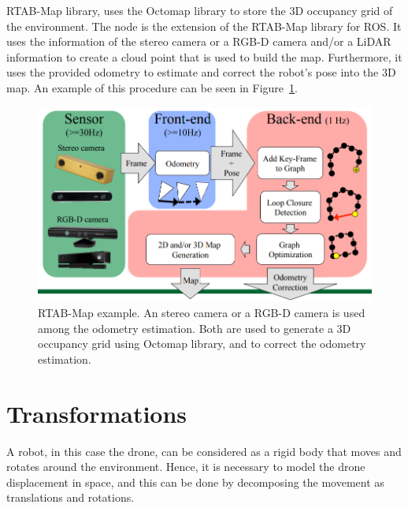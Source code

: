 \ac{RTAB-Map} library, uses the Octomap library to store the 3D occupancy grid of the environment. The  node is the extension of the \ac{RTAB-Map} library for \ac{ROS}. It uses the information of the stereo camera or a RGB-D camera and/or a LiDAR information to create a cloud point that is used to build the map. Furthermore, it uses the provided odometry to estimate and correct the robot's pose into the 3D map. An example of this procedure can be seen in Figure~\ref{fig:chapter1:ros:rtabmap}.

\begin{figure}
    \centering
    \includegraphics[width=\textwidth]{Images/fig14-rtabmap3.png}
    \caption[RTAB-Map example]{\ac{RTAB-Map} example. An stereo camera or a RGB-D camera is used among the odometry estimation. Both are used to generate a 3D occupancy grid using Octomap library, and to correct the odometry estimation. \cite{rtabmap-presentation}}
    \label{fig:chapter1:ros:rtabmap}
\end{figure}

\section{Transformations}
\label{sec:chapter1:transform}
A robot, in this case the drone, can be considered as a rigid body that moves and rotates around the environment. Hence, it is necessary to model the drone displacement in space, and this can be done by decomposing the movement as translations and rotations.

